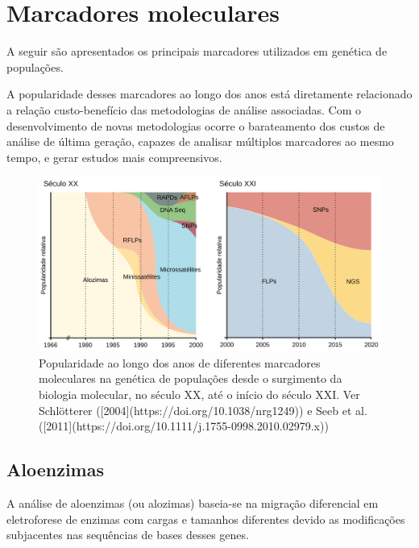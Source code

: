 \documentclass[
]{book}
\begin{document}
\hypertarget{marcadores-moleculares}{%
\section{Marcadores moleculares}\label{marcadores-moleculares}}

A seguir são apresentados os principais marcadores utilizados em genética de populações.

A popularidade desses marcadores ao longo dos anos está diretamente relacionado a relação custo-benefício das metodologias de análise associadas. Com o desenvolvimento de novas metodologias ocorre o barateamento dos custos de análise de última geração, capazes de analisar múltiplos marcadores ao mesmo tempo, e gerar estudos mais compreensivos.

\begin{figure}

{\centering \includegraphics[width=800px]{figs/markers_year} 

}

\caption{Popularidade ao longo dos anos de diferentes marcadores moleculares na genética de populações desde o surgimento da biologia molecular, no século XX, até o início do século XXI. Ver Schlötterer ([2004](https://doi.org/10.1038/nrg1249)) e Seeb et al. ([2011](https://doi.org/10.1111/j.1755-0998.2010.02979.x))}\label{fig:markeryear}
\end{figure}

\hypertarget{aloenzimas}{%
\subsection{Aloenzimas}\label{aloenzimas}}

A análise de aloenzimas (ou alozimas) baseia-se na migração diferencial em eletroforese de enzimas com cargas e tamanhos diferentes devido as modificações subjacentes nas sequências de bases desses genes.
\end{document}

